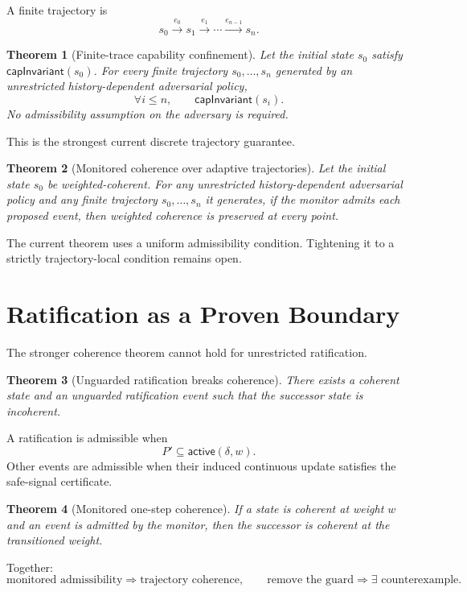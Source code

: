 \documentclass[11pt]{article}
\newtheorem{theorem}{Theorem}
\begin{document}
A finite trajectory is
\[
s_0\xrightarrow{e_0}s_1\xrightarrow{e_1}\cdots\xrightarrow{e_{n-1}}s_n.
\]

\begin{theorem}[Finite-trace capability confinement]
Let the initial state $s_0$ satisfy $\mathsf{capInvariant}(s_0)$. For every
finite trajectory $s_0,\dots,s_n$ generated by an unrestricted
history-dependent adversarial policy,
\[
\forall i\leq n,\qquad \mathsf{capInvariant}(s_i).
\]
No admissibility assumption on the adversary is required.
\end{theorem}

This is the strongest current discrete trajectory guarantee.

\begin{theorem}[Monitored coherence over adaptive trajectories]
Let the initial state $s_0$ be weighted-coherent. For any unrestricted
history-dependent adversarial policy and any finite trajectory
$s_0,\dots,s_n$ it generates, if the monitor admits each proposed event,
then weighted coherence is preserved at every point.
\end{theorem}

The current theorem uses a uniform admissibility condition. Tightening it to a strictly trajectory-local condition remains open.

\section{Ratification as a Proven Boundary}
The stronger coherence theorem cannot hold for unrestricted ratification.

\begin{theorem}[Unguarded ratification breaks coherence]
There exists a coherent state and an unguarded ratification event such that the successor state is incoherent.
\end{theorem}

A ratification is admissible when
\[
P'\subseteq\mathsf{active}(\delta,w).
\]
Other events are admissible when their induced continuous update satisfies the safe-signal certificate.

\begin{theorem}[Monitored one-step coherence]
If a state is coherent at weight $w$ and an event is admitted by the monitor, then the successor is coherent at the transitioned weight.
\end{theorem}

Together:
\[
\boxed{
\text{monitored admissibility}\Rightarrow\text{trajectory coherence},
\qquad
\text{remove the guard}\Rightarrow\exists\text{ counterexample}.
}
\]
\end{document}
